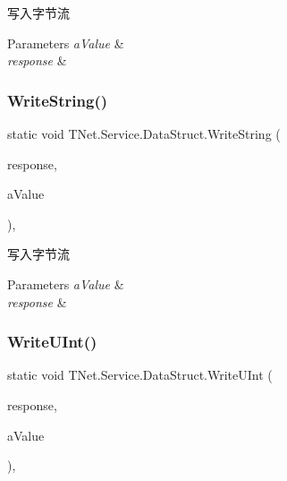 写入字节流 


\begin{DoxyParams}{Parameters}
{\em a\+Value} & \\
\hline
{\em response} & \\
\hline
\end{DoxyParams}
\mbox{\label{class_t_net_1_1_service_1_1_data_struct_a6c8ccf0cec1bef9038e69048e9b7f268}} 
\subsubsection{\texorpdfstring{Write\+String()}{WriteString()}}
{\footnotesize\ttfamily static void T\+Net.\+Service.\+Data\+Struct.\+Write\+String (\begin{DoxyParamCaption}\item[{\mbox{\hyperlink{class_t_net_1_1_service_1_1_base_game_response}{Base\+Game\+Response}}}]{response,  }\item[{string}]{a\+Value }\end{DoxyParamCaption})\hspace{0.3cm}{\ttfamily [static]}, {\ttfamily [protected]}}



写入字节流 


\begin{DoxyParams}{Parameters}
{\em a\+Value} & \\
\hline
{\em response} & \\
\hline
\end{DoxyParams}
\mbox{\label{class_t_net_1_1_service_1_1_data_struct_ac7fbd76a6a49b07904c5eca3c7a7584c}} 
\subsubsection{\texorpdfstring{Write\+U\+Int()}{WriteUInt()}}
{\footnotesize\ttfamily static void T\+Net.\+Service.\+Data\+Struct.\+Write\+U\+Int (\begin{DoxyParamCaption}\item[{\mbox{\hyperlink{class_t_net_1_1_service_1_1_base_game_response}{Base\+Game\+Response}}}]{response,  }\item[{U\+Int32}]{a\+Value }\end{DoxyParamCaption})\hspace{0.3cm}{\ttfamily [static]}, {\ttfamily [protected]}}



